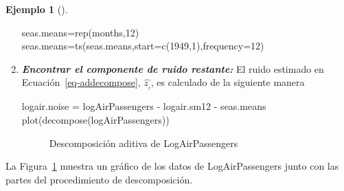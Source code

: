 \documentclass[
  us-letterpaper,
]{scrreprt}
\newenvironment{Shaded}{\begin{snugshade}}{\end{snugshade}}
\newcommand{\AttributeTok}[1]{\textcolor[rgb]{0.40,0.45,0.13}{#1}}
\newcommand{\DecValTok}[1]{\textcolor[rgb]{0.68,0.00,0.00}{#1}}
\newcommand{\FunctionTok}[1]{\textcolor[rgb]{0.28,0.35,0.67}{#1}}
\newcommand{\NormalTok}[1]{\textcolor[rgb]{0.00,0.23,0.31}{#1}}
\newcommand{\OtherTok}[1]{\textcolor[rgb]{0.00,0.23,0.31}{#1}}
\newcommand{\SpecialCharTok}[1]{\textcolor[rgb]{0.37,0.37,0.37}{#1}}
\theoremstyle{definition}
\newtheorem{example}{Ejemplo}[chapter]
\theoremstyle{plain}
\theoremstyle{plain}
\theoremstyle{definition}
\theoremstyle{remark}
\begin{document}
\begin{example}[]
\begin{tcolorbox}
\begin{enumerate}
\begin{Shaded}
\begin{Highlighting}[]
\NormalTok{seas.means}\OtherTok{=}\FunctionTok{rep}\NormalTok{(months,}\DecValTok{12}\NormalTok{)}
\NormalTok{seas.means}\OtherTok{=}\FunctionTok{ts}\NormalTok{(seas.means,}\AttributeTok{start=}\FunctionTok{c}\NormalTok{(}\DecValTok{1949}\NormalTok{,}\DecValTok{1}\NormalTok{),}\AttributeTok{frequency=}\DecValTok{12}\NormalTok{)}
\end{Highlighting}
\end{Shaded}
\item
  \textbf{\emph{Encontrar el componente de ruido restante:}} El ruido
  estimado en Ecuación~\ref{eq-addecompose}, \(\hat{z_{_t}}\), es
  calculado de la siguiente manera

\begin{Shaded}
\begin{Highlighting}[]
\NormalTok{logair.noise }\OtherTok{=}\NormalTok{ logAirPassengers }\SpecialCharTok{{-}}\NormalTok{ logair.sm12 }\SpecialCharTok{{-}}\NormalTok{ seas.means}
\FunctionTok{plot}\NormalTok{(}\FunctionTok{decompose}\NormalTok{(logAirPassengers))}
\end{Highlighting}
\end{Shaded}

  \begin{figure}[H]


  \caption{\label{fig-descadd}Descomposición aditiva de
  LogAirPassengers}

  \end{figure}%
\end{enumerate}

La Figura~\ref{fig-descadd} muestra un gráfico de los datos de
LogAirPassengers junto con las partes del procedimiento de
descomposición.

\end{tcolorbox}

\end{example}
\end{document}
